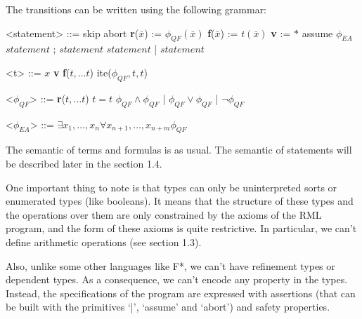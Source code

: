 \documentclass[11pt,a4paper,oldfontcommands,openany]{memoir}
\begin{document}
    The transitions can be written using the following grammar:
    \begin{multicols}{2}
        \begin{grammar}

            <statement> ::= skip
            \alt abort
            \alt \textbf{r}(\(\bar{x}\)) := \( \phi_{QF}(\bar{x}) \)
            \alt \textbf{f}(\(\bar{x}\)) := \( t(\bar{x}) \)
            \alt \textbf{v} := \( * \)
            \alt assume \( \phi_{EA} \)
            \alt \( statement \) ; \( statement \)
            \alt \( statement \) | \( statement \)
            
        \end{grammar}

        \columnbreak

        \begin{grammar}

            <t> ::= \(x\)
            \alt \textbf{v}
            \alt \textbf{f}(\(t,\ldots t\))
            \alt ite(\( \phi_{QF},t,t\))

            <\( \phi_{QF} \)> ::= \textbf{r}(\(t,\ldots t\))
            \alt \( t = t \)
            \alt \( \phi_{QF} \land \phi_{QF} \) \quad | \quad \( \phi_{QF} \lor \phi_{QF} \) \quad | \quad \( \neg \phi_{QF} \)
            
            <\( \phi_{EA} \)> ::= \( \exists x_1,\ldots,x_n \forall x_{n+1},\ldots,x_{n+m} \phi_{QF} \)

        \end{grammar}
    \end{multicols}

    The semantic of terms and formulas is as usual. The semantic of statements will be described later in the section 1.4.

    One important thing to note is that types can only be uninterpreted sorts or enumerated types (like booleans).
    It means that the structure of these types and the operations over them are only constrained by the axioms of the RML program,
    and the form of these axioms is quite restrictive.
    In particular, we can't define arithmetic operations (see section 1.3).

    Also, unlike some other languages like F*, we can't have refinement types or dependent types.
    As a consequence, we can't encode any property in the types.
    Instead, the specifications of the program are expressed with assertions (that can be built with the primitives `|', `assume' and `abort')
    and safety properties.
\end{document}

